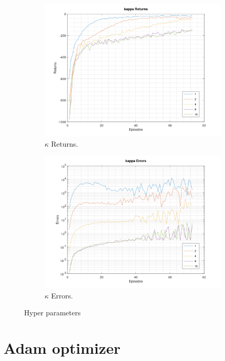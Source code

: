 \documentclass[a4paper,11pt]{article}
\begin{document}
\begin{figure}[h!]
	\begin{subfigure}[b]{0.4\linewidth}
		\includegraphics[width=\linewidth]{kappa-returns.png}
		\caption{$\kappa$ Returns.}
	\end{subfigure}
	\begin{subfigure}[b]{0.4\linewidth}
		\includegraphics[width=\linewidth]{kappa-errors.png}
		\caption{$\kappa$ Errors.}
	\end{subfigure}

	\caption{Hyper parameters}
	\label{fig:hyper}
\end{figure}

\section{Adam optimizer}
\end{document}
